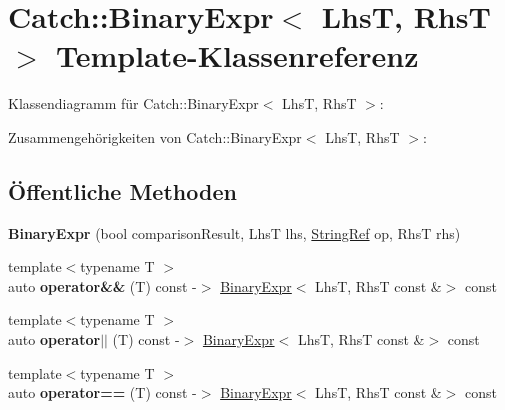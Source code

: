 \hypertarget{classCatch_1_1BinaryExpr}{}\section{Catch\+:\+:Binary\+Expr$<$ LhsT, RhsT $>$ Template-\/\+Klassenreferenz}
\label{classCatch_1_1BinaryExpr}


Klassendiagramm für Catch\+:\+:Binary\+Expr$<$ LhsT, RhsT $>$\+:


Zusammengehörigkeiten von Catch\+:\+:Binary\+Expr$<$ LhsT, RhsT $>$\+:
\subsection*{Öffentliche Methoden}
\begin{DoxyCompactItemize}
\item 
\mbox{\label{classCatch_1_1BinaryExpr_a657d66346aef97a760c22776fe6008b6}} 
{\bfseries Binary\+Expr} (bool comparison\+Result, LhsT lhs, \hyperlink{classCatch_1_1StringRef}{String\+Ref} op, RhsT rhs)
\item 
\mbox{\label{classCatch_1_1BinaryExpr_ab51d6e5b8303c5777fd5af916e2fafff}} 
{\footnotesize template$<$typename T $>$ }\\auto {\bfseries operator\&\&} (T) const -\/$>$ \hyperlink{classCatch_1_1BinaryExpr}{Binary\+Expr}$<$ LhsT, RhsT const \&$>$ const
\item 
\mbox{\label{classCatch_1_1BinaryExpr_a44234233ad4fa42e7c95b6a0d94af9db}} 
{\footnotesize template$<$typename T $>$ }\\auto {\bfseries operator$\vert$$\vert$} (T) const -\/$>$ \hyperlink{classCatch_1_1BinaryExpr}{Binary\+Expr}$<$ LhsT, RhsT const \&$>$ const
\item 
\mbox{\label{classCatch_1_1BinaryExpr_a56d7983b7c826c4924423618ffb40e44}} 
{\footnotesize template$<$typename T $>$ }\\auto {\bfseries operator==} (T) const -\/$>$ \hyperlink{classCatch_1_1BinaryExpr}{Binary\+Expr}$<$ LhsT, RhsT const \&$>$ const
\item 
\mbox{\label{classCatch_1_1BinaryExpr_a1c5d4b87cc18452ebe1254e0067dd476}} 

\end{DoxyCompactItemize}
